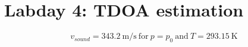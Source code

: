 \documentclass[final]{scrreprt} %
\begin{document}
\chapter{Labday 4: TDOA estimation}
\label{ch:labday4}

\begin{equation}
v_{sound} = \SI{343.2}{\meter\per\second}~\mathrm{for}~p = p_0~\mathrm{and}~T = \SI{293.15}{\kelvin}
\end{equation}
\end{document}
